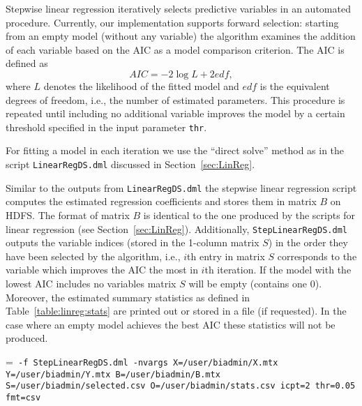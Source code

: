 \smallskip

Stepwise linear regression iteratively selects predictive variables in an automated procedure.
Currently, our implementation supports forward selection: starting from an empty model (without any variable) 
the algorithm examines the addition of each variable based on the AIC as a model comparison criterion. The AIC is defined as  
\begin{equation}
AIC = -2 \log{L} + 2 edf,\label{eq:AIC}
\end{equation}    
where $L$ denotes the likelihood of the fitted model and $edf$ is the equivalent degrees of freedom, i.e., the number of estimated parameters. 
This procedure is repeated until including no additional variable improves the model by a certain threshold 
specified in the input parameter {\tt thr}. 

For fitting a model in each iteration we use the ``direct solve'' method as in the script {\tt LinearRegDS.dml} discussed in Section~\ref{sec:LinReg}.  


\smallskip
{}
\smallskip

Similar to the outputs from {\tt LinearRegDS.dml} the stepwise linear regression script computes 
the estimated regression coefficients and stores them in matrix $B$ on HDFS. 
The format of matrix $B$ is identical to the one produced by the scripts for linear regression (see Section~\ref{sec:LinReg}).   
Additionally, {\tt StepLinearRegDS.dml} outputs the variable indices (stored in the 1-column matrix $S$) 
in the order they have been selected by the algorithm, i.e., $i$th entry in matrix $S$ corresponds to 
the variable which improves the AIC the most in $i$th iteration.  
If the model with the lowest AIC includes no variables matrix $S$ will be empty (contains one 0). 
Moreover, the estimated summary statistics as defined in Table~\ref{table:linreg:stats}
are printed out or stored in a file (if requested). 
In the case where an empty model achieves the best AIC these statistics will not be produced. 


\smallskip
{}
\smallskip

{\hangindent=\parindent\noindent\tt
	\hml -f StepLinearRegDS.dml -nvargs X=/user/biadmin/X.mtx Y=/user/biadmin/Y.mtx
	B=/user/biadmin/B.mtx S=/user/biadmin/selected.csv O=/user/biadmin/stats.csv
	icpt=2 thr=0.05 fmt=csv
	
}


